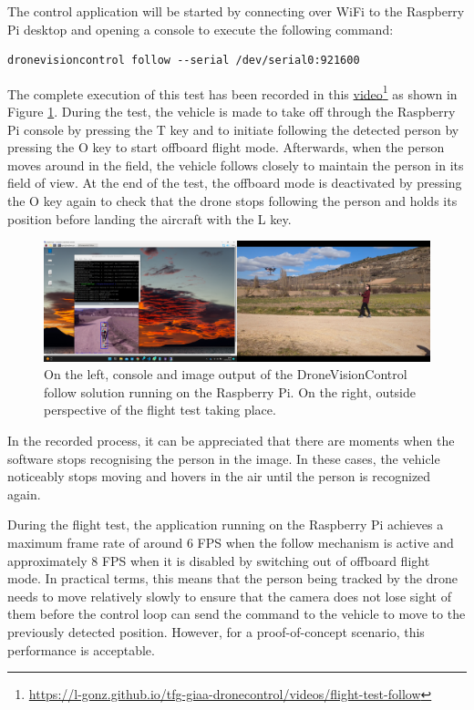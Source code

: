 The control application will be started by connecting over WiFi to the Raspberry Pi desktop and opening a console to execute the following command:
\begin{verbatim}
dronevisioncontrol follow --serial /dev/serial0:921600
\end{verbatim}


The complete execution of this test has been recorded in this \href{https://l-gonz.github.io/tfg-giaa-dronecontrol/videos/flight-test-follow}{video}\footnote{\url{https://l-gonz.github.io/tfg-giaa-dronecontrol/videos/flight-test-follow}} as shown in Figure \ref{fig:flight-test-follow}. During the test, the vehicle is made to take off through the Raspberry Pi console by pressing the T key and to initiate following the detected person by pressing the O key to start offboard flight mode. Afterwards, when the person moves around in the field, the vehicle follows closely to maintain the person in its field of view. At the end of the test, the offboard mode is deactivated by pressing the O key again to check that the drone stops following the person and holds its position before landing the aircraft with the L key.

\begin{figure}[H]
  \centering
  \includegraphics[width=\textwidth, keepaspectratio]{img/video-field-test-follow.png}
  \caption{On the left, console and image output of the DroneVisionControl follow solution running on the Raspberry Pi. On the right, outside perspective of the flight test taking place.}
  \label{fig:flight-test-follow}
\end{figure}

In the recorded process, it can be appreciated that there are moments when the software stops recognising the person in the image. In these cases, the vehicle noticeably stops moving and hovers in the air until the person is recognized again.

During the flight test, the application running on the Raspberry Pi achieves a maximum frame rate of around 6 FPS when the follow mechanism is active and approximately 8 FPS when it is disabled by switching out of offboard flight mode. In practical terms, this means that the person being tracked by the drone needs to move relatively slowly to ensure that the camera does not lose sight of them before the control loop can send the command to the vehicle to move to the previously detected position. However, for a proof-of-concept scenario, this performance is acceptable.

